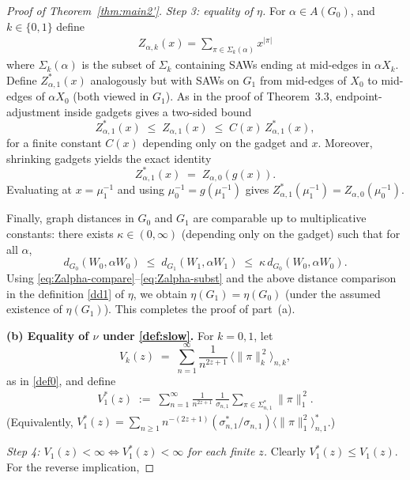 \documentclass[12pt]{amsart}
\theoremstyle{plain}
\numberwithin{equation}{section}
\numberwithin{theorem}{section}
\numberwithin{figure}{section}
\begin{document}
\begin{proof}[Proof of Theorem~\ref{thm:main2'}]
\smallskip\noindent
\emph{Step 3: equality of $\eta$.}
For $\alpha\in A(G_0)$, and $k\in\{0,1\}$ define 
\begin{align*}
Z_{\alpha,k}(x)=\sum_{\pi\in \Sigma_k(\alpha)}x^{|\pi|}
\end{align*}
where $\Sigma_k(\alpha
)$ is the subset of $\Sigma_k$ containing SAWs ending at mid-edges in $\alpha X_k$.
Define $Z_{\alpha,1}^\ast(x)$ analogously but with SAWs on $G_1$ from mid-edges of $X_0$ to mid-edges of
$\alpha X_0$ (both viewed in $G_1$).  As in the proof of Theorem~3.3, endpoint-adjustment inside gadgets gives
a two-sided bound
\begin{equation}\label{eq:Zalpha-compare}
Z_{\alpha,1}^\ast(x)\;\le\; Z_{\alpha,1}(x)\;\le\;C(x)\,Z_{\alpha,1}^\ast(x),
\end{equation}
for a finite constant $C(x)$ depending only on the gadget and $x$.
Moreover, shrinking gadgets yields the exact identity
\begin{equation}\label{eq:Zalpha-subst}
Z_{\alpha,1}^\ast(x)\;=\;Z_{\alpha,0}(g(x)).
\end{equation}
Evaluating at $x=\mu_1^{-1}$ and using $\mu_0^{-1}=g(\mu_1^{-1})$ gives
$Z_{\alpha,1}^\ast(\mu_1^{-1})=Z_{\alpha,0}(\mu_0^{-1})$.

Finally, graph distances in $G_0$ and $G_1$ are comparable up to multiplicative constants:
there exists $\kappa\in(0,\infty)$ (depending only on the gadget) such that for all $\alpha$,
\[
d_{G_0}(W_0,\alpha W_0)\;\le\; d_{G_1}(W_1,\alpha W_1)\;\le\;\kappa\, d_{G_0}(W_0,\alpha W_0).
\]
Using \eqref{eq:Zalpha-compare}--\eqref{eq:Zalpha-subst} and the above distance comparison in the definition
\eqref{dd1} of $\eta$, we obtain $\eta(G_1)=\eta(G_0)$ (under the assumed existence of $\eta(G_1)$).
This completes the proof of part~(a).

\medskip\noindent
\textbf{(b) Equality of $\nu$ under \eqref{def:slow}.}
For $k=0,1$, let
\[
V_k(z)\;=\;\sum_{n=1}^\infty \frac{1}{n^{2z+1}}\,\Big\langle \|\pi\|_k^{\,2}\Big\rangle_{n,k},
\]
as in \eqref{def0}, and define
\begin{align}
V_1^\ast(z)\;:=\;\sum_{n=1}^\infty \frac{1}{n^{2z+1}}\,
\frac{1}{\sigma_{n,1}}\sum_{\pi\in\Sigma_{n,1}^\ast}\|\pi\|_1^{\,2}.\label{dv1s}
\end{align}
(Equivalently, $V_1^\ast(z)=\sum_{n\ge 1}n^{-(2z+1)}(\sigma_{n,1}^\ast/\sigma_{n,1})\langle\|\pi\|_1^2\rangle_{n,1}^\ast$.)

\smallskip\noindent
\emph{Step 4: $V_1(z)<\infty \iff V_1^\ast(z)<\infty$ for each finite $z$.}
Clearly $V_1^\ast(z)\le V_1(z)$.
For the reverse implication,  




\end{proof}
\end{document}
